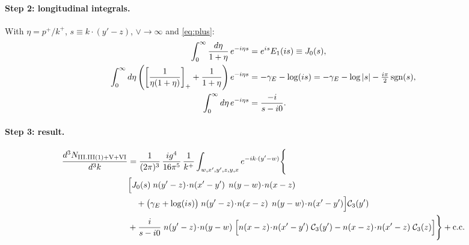 \documentclass[10pt]{article}
\numberwithin{equation}{section}
\begin{document}
\paragraph{Step 2: longitudinal integrals.} With $\eta=p^{+}/k^{+}$, $s\equiv k\cdot(y'-z)$, $\vee\to\infty$ and \eqref{eq:plus}:
\begin{align}
\int_{0}^{\infty}\frac{d\eta}{1+\eta}\,e^{-i\eta s}&=e^{is}E_{1}(is)\equiv J_{0}(s),\notag\\
\int_{0}^{\infty}d\eta\left(\left[\frac{1}{\eta(1+\eta)}\right]_{+}+\frac{1}{1+\eta}\right)e^{-i\eta s}&=-\gamma_{E}-\log(is)=-\gamma_{E}-\log|s|-\tfrac{i\pi}{2}\,{\rm sgn}(s),\notag\\
\int_{0}^{\infty}d\eta\,e^{-i\eta s}&=\frac{-i}{s-i0} .
\end{align}

\paragraph{Step 3: result.}
\begin{align}
\frac{d^{3}N_{\rm III.III(1)+V+VI}}{d^{3}k}&=\frac{1}{(2\pi)^{3}}\,\frac{ig^{4}}{16\pi^{5}}\,\frac{1}{k^{+}}\int_{w,x',y',z,y,x}e^{-ik\cdot(y'-w)}\Bigg\{\notag\\
&\Big[J_{0}(s)\;n(y'-z)\!\cdot\!n(x'-y')\;\,n(y-w)\!\cdot\!n(x-z)\notag\\
&\quad+\big(\gamma_{E}+\log(is)\big)\;n(y'-z)\!\cdot\!n(x-z)\;\,n(y-w)\!\cdot\!n(x'-y')\Big]\mathcal{C}_{3}(y')\notag\\
&+\frac{i}{s-i0}\;n(y'-z)\!\cdot\!n(y-w)\;\Big[n(x-z)\!\cdot\!n(x'-y')\;\mathcal{C}_{3}(y')-n(x-z)\!\cdot\!n(x'-z)\;\mathcal{C}_{3}(z)\Big]\Bigg\}+{\rm c.c.} \label{eq:GIII3LO}
\end{align}
\end{document}
